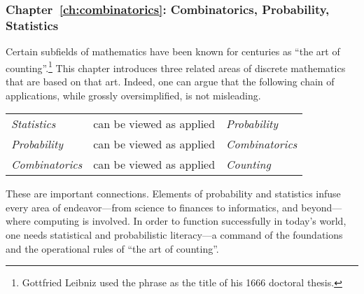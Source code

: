 \subsubsection{Chapter~\ref{ch:combinatorics}: 
Combinatorics, Probability, Statistics}

Certain subfields of mathematics have been known for centuries as
``the art of counting''.\footnote{Gottfried Leibniz used the phrase as
  the title of his 1666 doctoral thesis. 
} This chapter introduces
three related areas of discrete mathematics that are based on that
art.  Indeed, one can argue that the following chain of applications,
while grossly oversimplified, is not misleading.

\smallskip

\begin{tabular}{lcl}
{\it Statistics} & can be viewed as applied & {\it Probability} \\
{\it Probability} & can be viewed as applied & {\it Combinatorics} \\
{\it Combinatorics} & can be viewed as applied & {\it Counting}
\end{tabular}

\smallskip

\noindent
These are important connections.  Elements of probability and
statistics infuse every area of endeavor---from science to finances to
informatics, and beyond---where computing is involved.  In order to
function successfully in today's world, one needs statistical and
probabilistic literacy---a command of the foundations and the
operational rules of ``the art of counting''.

